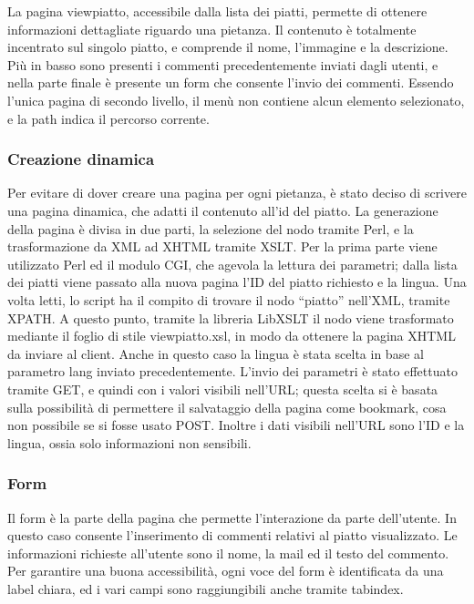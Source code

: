 \documentclass[10pt,a4paper,onecolumn]{article}
\begin{document}
La pagina viewpiatto, accessibile dalla lista dei piatti, permette di ottenere informazioni dettagliate riguardo una pietanza. Il contenuto è totalmente incentrato sul singolo piatto, e comprende il nome, l’immagine e la descrizione. Più in basso sono presenti i commenti precedentemente inviati dagli utenti, e nella parte finale è presente un form che consente l’invio dei commenti.
Essendo l’unica pagina di secondo livello, il menù non contiene alcun elemento selezionato, e la path indica il percorso corrente.

\subsubsection{Creazione dinamica}

Per evitare di dover creare una pagina per ogni pietanza, è stato deciso di scrivere una pagina dinamica, che adatti il contenuto all’id del piatto.
La generazione della pagina è divisa in due parti, la selezione del nodo tramite Perl, e la trasformazione da XML ad XHTML tramite XSLT.
Per la prima parte viene utilizzato Perl ed il modulo CGI, che agevola la lettura dei parametri; dalla lista dei piatti viene passato alla nuova pagina l’ID del piatto richiesto e la lingua. Una volta letti, lo script ha il compito di trovare il nodo ``piatto'' nell’XML, tramite XPATH.
A questo punto, tramite la libreria LibXSLT il nodo viene trasformato mediante il foglio di stile viewpiatto.xsl, in modo da ottenere la pagina XHTML da inviare al client. Anche in questo caso la lingua è stata scelta in base al parametro lang inviato precedentemente.
L’invio dei parametri è stato effettuato tramite GET, e quindi con i valori visibili nell’URL; questa scelta si è basata sulla possibilità di permettere il salvataggio della pagina come bookmark, cosa non possibile se si fosse usato POST. Inoltre i dati visibili nell’URL sono l’ID e la lingua, ossia solo informazioni non sensibili.

\subsubsection{Form}

Il form è la parte della pagina che permette l’interazione da parte dell’utente. In questo caso consente l’inserimento di commenti relativi al piatto visualizzato.
Le informazioni richieste all’utente sono il nome, la mail ed il testo del commento.
Per garantire una buona accessibilità, ogni voce del form è identificata da una label chiara, ed i vari campi sono raggiungibili anche tramite tabindex.
\end{document}
